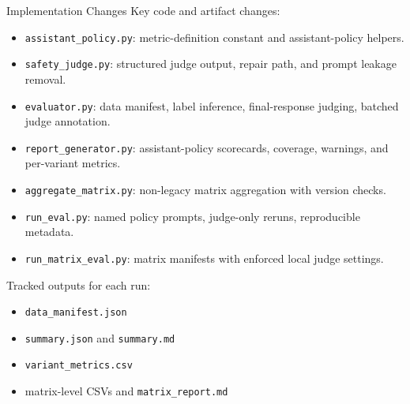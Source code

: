 \documentclass[10pt]{beamer}
\begin{document}
\begin{frame}{Implementation Changes}
\small
Key code and artifact changes:
\begin{itemize}
  \item \texttt{assistant\_policy.py}: metric-definition constant and assistant-policy helpers.
  \item \texttt{safety\_judge.py}: structured judge output, repair path, and prompt leakage removal.
  \item \texttt{evaluator.py}: data manifest, label inference, final-response judging, batched judge annotation.
  \item \texttt{report\_generator.py}: assistant-policy scorecards, coverage, warnings, and per-variant metrics.
  \item \texttt{aggregate\_matrix.py}: non-legacy matrix aggregation with version checks.
  \item \texttt{run\_eval.py}: named policy prompts, judge-only reruns, reproducible metadata.
  \item \texttt{run\_matrix\_eval.py}: matrix manifests with enforced local judge settings.
\end{itemize}

\vspace{0.6em}
Tracked outputs for each run:
\begin{itemize}
  \item \texttt{data\_manifest.json}
  \item \texttt{summary.json} and \texttt{summary.md}
  \item \texttt{variant\_metrics.csv}
  \item matrix-level CSVs and \texttt{matrix\_report.md}
\end{itemize}
\end{frame}
\end{document}
